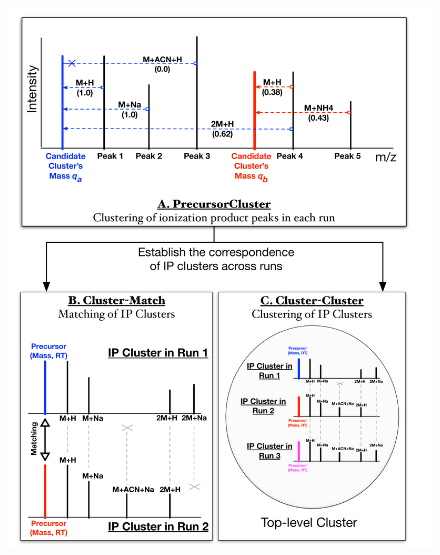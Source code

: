 \begin{figure}[!htbp]
\centering\includegraphics[width=1.0\linewidth]{06-precursor-cluster/figures/fig1.pdf}

\end{figure}
